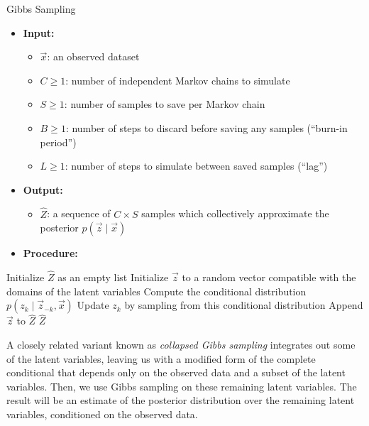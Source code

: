 \documentclass{article}
\begin{document}
\begin{algorithm}[hbt]
\caption{Gibbs Sampling}
\label{alg:gibbs}
\renewcommand{\labelitemi}{{$\bullet$}}
\renewcommand{\labelitemii}{{\tiny$\blacksquare$}}
\begin{itemize}[leftmargin=*]
\item \textbf{Input:}
  \begin{itemize}
  \item $\vec x$: an observed dataset
  \item $C \geq 1$: number of independent Markov chains to simulate
  \item $S \geq 1$: number of samples to save per Markov chain
  \item $B \geq 1$: number of steps to discard before saving any samples (``burn-in period'')
  \item $L \geq 1$: number of steps to simulate between saved samples (``lag'')
  \end{itemize}
\item \textbf{Output:}
  \begin{itemize}
  \item $\hat Z$: a sequence of $C \times S$ samples which collectively approximate the posterior $p(\vec z \mid \vec x)$
  \end{itemize}
\item \textbf{Procedure:}
\end{itemize}
\begin{algorithmic}
\State Initialize $\hat Z$ as an empty list
  \State Initialize $\vec z$ to a random vector compatible with the domains of the latent variables
    \State Compute the conditional distribution $p(z_k \mid \vec z_{-k}, \vec x)$
    \State Update $z_k$ by sampling from this conditional distribution
      \State Append $\vec z$ to $\hat Z$
    \EndIf
  \EndFor
\EndFor
\State \Return $\hat Z$
\end{algorithmic}
\end{algorithm}

A closely related variant known as \emph{collapsed Gibbs sampling} integrates out some of the latent variables, leaving us with a modified form of the complete conditional that depends only on the observed data and a subset of the latent variables.
Then, we use Gibbs sampling on these remaining latent variables.
The result will be an estimate of the posterior distribution over the remaining latent variables, conditioned on the observed data.
\end{document}
